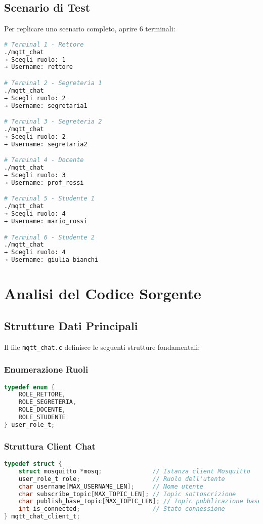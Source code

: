 \documentclass[12pt,a4paper]{article}
\begin{document}
\subsection{Scenario di Test}

Per replicare uno scenario completo, aprire 6 terminali:

\begin{lstlisting}[language=bash, caption=Setup Multi-Utente]
# Terminal 1 - Rettore
./mqtt_chat
→ Scegli ruolo: 1
→ Username: rettore

# Terminal 2 - Segreteria 1  
./mqtt_chat
→ Scegli ruolo: 2
→ Username: segretaria1

# Terminal 3 - Segreteria 2
./mqtt_chat  
→ Scegli ruolo: 2
→ Username: segretaria2

# Terminal 4 - Docente
./mqtt_chat
→ Scegli ruolo: 3  
→ Username: prof_rossi

# Terminal 5 - Studente 1
./mqtt_chat
→ Scegli ruolo: 4
→ Username: mario_rossi

# Terminal 6 - Studente 2  
./mqtt_chat
→ Scegli ruolo: 4
→ Username: giulia_bianchi
\end{lstlisting}

\section{Analisi del Codice Sorgente}

\subsection{Strutture Dati Principali}

Il file \texttt{mqtt\_chat.c} definisce le seguenti strutture fondamentali:

\subsubsection{Enumerazione Ruoli}
\begin{lstlisting}[language=c, caption=Definizione Ruoli Utente]
typedef enum {
    ROLE_RETTORE,
    ROLE_SEGRETERIA,
    ROLE_DOCENTE,
    ROLE_STUDENTE
} user_role_t;
\end{lstlisting}

\subsubsection{Struttura Client Chat}
\begin{lstlisting}[language=c, caption=Struttura Client MQTT]
typedef struct {
    struct mosquitto *mosq;              // Istanza client Mosquitto
    user_role_t role;                    // Ruolo dell'utente
    char username[MAX_USERNAME_LEN];     // Nome utente
    char subscribe_topic[MAX_TOPIC_LEN]; // Topic sottoscrizione
    char publish_base_topic[MAX_TOPIC_LEN]; // Topic pubblicazione base
    int is_connected;                    // Stato connessione
} mqtt_chat_client_t;
\end{lstlisting}
\end{document}
